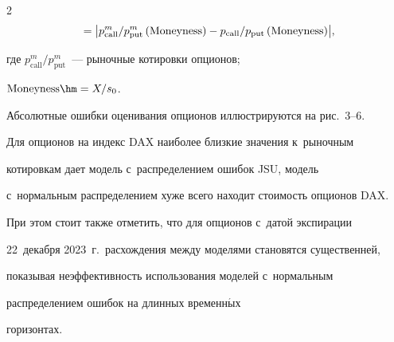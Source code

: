 \begin{multicols}{2}
\begin{multline*}
\!=\!\,\left\vert p^m_{\mathrm{call}}/p^m_{\mathrm{put}}


  \left( \mathrm{Moneyness}\right) -


p_{\mathrm{call}}/p_{\mathrm{put}}\left( \mathrm{Moneyness}\right)


  \!\,\right\vert\!,\hspace*{-5.9pt}




  \end{multline*}


где $p^m_{\mathrm{call}}/p^m_{\mathrm{put}}$~---  рыночные котировки опционов; 


$\mathrm{Moneyness}\hm=X/s_0$. 











  Абсолютные ошибки оценивания опционов иллюстрируются на рис.~3--6. 


Для опционов на индекс DAX наиболее близкие значения к~рыночным 


котировкам дает модель с~распределением ошибок JSU, модель 


с~нормальным распределением хуже всего находит стоимость опционов DAX. 


При этом стоит также отметить, что для опционов с~датой экспирации 


22~декабря 2023~г.\ расхождения между моделями становятся существенней, 


показывая неэффективность использования моделей с~нормальным 


распределением ошибок на длинных временн$\acute{\mbox{ы}}$х


горизонтах. 


\pagebreak





\end{multicols}









